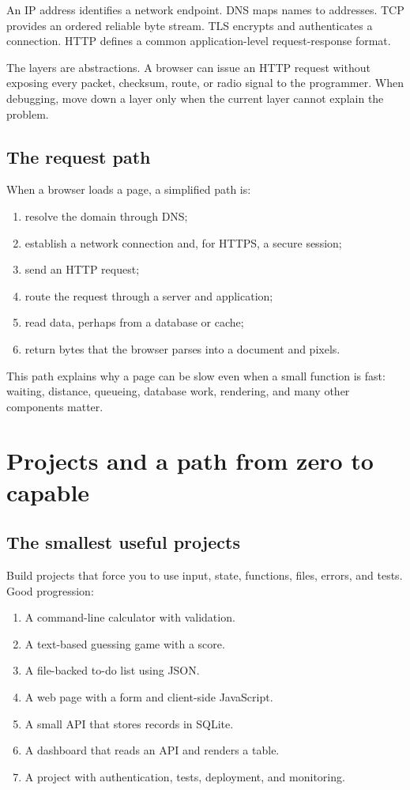 \documentclass[11pt,openany,oneside]{book}
\begin{document}
An IP address identifies a network endpoint. DNS maps names to addresses. TCP provides an ordered reliable byte stream. TLS encrypts and authenticates a connection. HTTP defines a common application-level request-response format.

The layers are abstractions. A browser can issue an HTTP request without exposing every packet, checksum, route, or radio signal to the programmer. When debugging, move down a layer only when the current layer cannot explain the problem.

\section{The request path}

When a browser loads a page, a simplified path is:

\begin{enumerate}
  \item resolve the domain through DNS;
  \item establish a network connection and, for HTTPS, a secure session;
  \item send an HTTP request;
  \item route the request through a server and application;
  \item read data, perhaps from a database or cache;
  \item return bytes that the browser parses into a document and pixels.
\end{enumerate}

This path explains why a page can be slow even when a small function is fast: waiting, distance, queueing, database work, rendering, and many other components matter.

\chapter{Projects and a path from zero to capable}

\section{The smallest useful projects}

Build projects that force you to use input, state, functions, files, errors, and tests. Good progression:

\begin{enumerate}
  \item A command-line calculator with validation.
  \item A text-based guessing game with a score.
  \item A file-backed to-do list using JSON.
  \item A web page with a form and client-side JavaScript.
  \item A small API that stores records in SQLite.
  \item A dashboard that reads an API and renders a table.
  \item A project with authentication, tests, deployment, and monitoring.
\end{enumerate}
\end{document}
